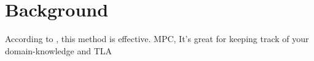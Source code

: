 \section{Background}

According to \cite{navarro1997aberrations}, this method is effective. \ac{MPC}, It's great for keeping track of your domain-knowledge and \ac{TLA}